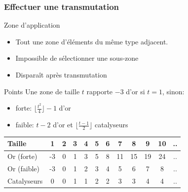 \documentclass{beamer}
\begin{document}
\begin{frame}
    \frametitle{Effectuer une transmutation}

    \begin{block}{Zone d'application}
        \begin{itemize}
            \item Tout une zone d'éléments du même type adjacent.
            \item Impossible de sélectionner une sous-zone
            \item Disparaît après transmutation
        \end{itemize}
    \end{block}
    \begin{block}{Points}
        Une zone de taille $t$ rapporte $-3$ d'or si $t = 1$, sinon:
        \begin{itemize}
            \item forte: $\lfloor \frac{t^2}4 \rfloor - 1$ d'or
            \item faible: $t - 2$ d'or et
                $\lfloor \frac{t-1}2 \rfloor$ catalyseurs
        \end{itemize}
        \begin{tabular}{l|c|c|c|c|c|c|c|c|c|c|c}
            Taille & 1 & 2 & 3 & 4 & 5 & 6 & 7 & 8 & 9 & 10 & ..\\
            \hline
            Or (forte)   & -3 & 0 & 1 & 3 & 5 & 8 & 11 & 15 & 19 & 24 & ..\\
            \hline
            Or (faible)  & -3 & 0 & 1 & 2 & 3 & 4 & 5  & 6  & 7  & 8  & ..\\
            \hline
            Catalyseurs     & 0  & 0 & 1 & 1 & 2 & 2 & 3  & 3  & 4  & 4  & ..
        \end{tabular}
    \end{block}
\end{frame}
\end{document}
